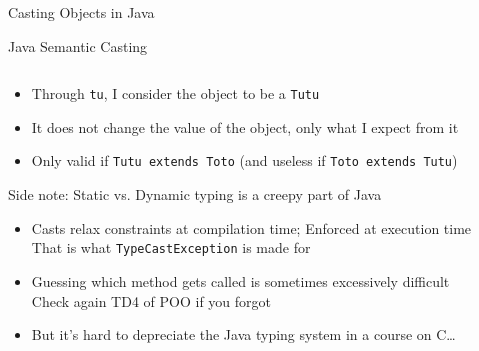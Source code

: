 \begin{Coupe}
\begin{frame}{Casting Objects in Java}
\begin{block}{Java Semantic Casting}
\begin{columns}
      \begin{column}{.3\linewidth}
      \end{column}
    \end{columns}
    
    \begin{itemize}
    \item Through \texttt{tu}, I consider the object to be a \texttt{Tutu}
    \item It does not change the value of the object, only what I expect from it
    \item Only valid if \texttt{Tutu extends Toto} (and useless if \texttt{Toto extends Tutu})
    \end{itemize}    
  \end{block}
  \begin{block}{Side note: Static vs. Dynamic typing is a creepy part of Java}
    \begin{itemize}
    \item Casts relax constraints at compilation time; Enforced at execution time\\
      That is what \texttt{TypeCastException} is made for
    \item Guessing which method gets called is sometimes excessively
      difficult\\
      {\small Check again TD4 of POO if you forgot}
    \item But it's hard to depreciate the Java typing system in a course on C\ldots
    \end{itemize}
  \end{block}
\end{frame}
\end{Coupe}

